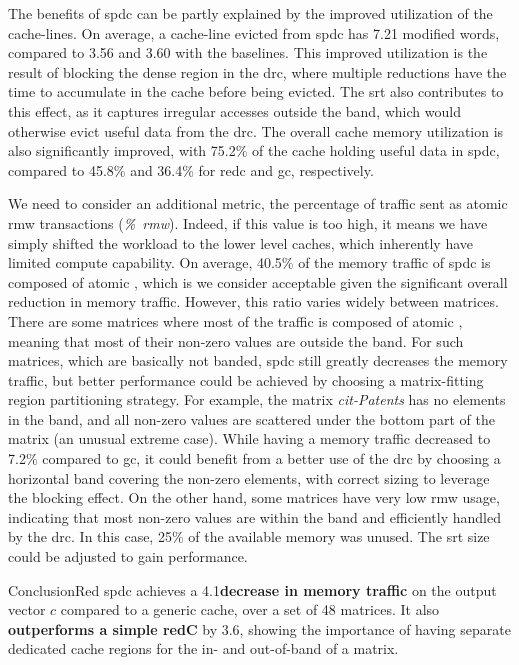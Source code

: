 The benefits of \acrlong{spdc} can be partly explained by the improved utilization of the cache-lines.
On average, a cache-line evicted from \acrlong{spdc} has 7.21 modified words, compared to 3.56 and 3.60 with the baselines.
This improved utilization is the result of blocking the dense region in the \acrshort{drc}, where multiple \glspl{reduction} have the time to accumulate in the cache before being evicted.
The \acrshort{srt} also contributes to this effect, as it captures irregular accesses outside the \gls{band}, which would otherwise evict useful data from the \acrshort{drc}.
The overall cache memory utilization is also significantly improved, with 75.2\% of the cache holding useful data in \acrlong{spdc}, compared to 45.8\% and 36.4\% for \acrshort{redc} and \acrshort{gc}, respectively.

We need to consider an additional metric, the percentage of traffic sent as atomic \acrshort{rmw} transactions (\textit{\%~\acrshort{rmw}}).
Indeed, if this value is too high, it means we have simply shifted the workload to the lower level caches, which inherently have limited compute capability.
On average, 40.5\% of the memory traffic of \acrlong{spdc} is composed of atomic , which is we consider acceptable given the significant overall reduction in memory traffic.
However, this ratio varies widely between matrices.
There are some matrices where most of the traffic is composed of atomic , meaning that most of their non-zero values are outside the \gls{band}.
For such matrices, which are basically not banded, \acrlong{spdc} still greatly decreases the memory traffic, but better performance could be achieved by choosing a matrix-fitting region partitioning strategy.
For example, the matrix \emph{cit-Patents} has no elements in the \gls{band}, and all non-zero values are scattered under the bottom part of the matrix (an unusual extreme case).
While having a memory traffic decreased to 7.2\% compared to \acrshort{gc}, it could benefit from a better use of the \acrshort{drc} by choosing a horizontal band covering the non-zero elements, with correct sizing to leverage the blocking effect.
On the other hand, some matrices have very low \acrshort{rmw} usage, indicating that most non-zero values are within the \gls{band} and efficiently handled by the \acrshort{drc}.
In this case, 25\% of the available memory was unused.
The \acrshort{srt} size could be adjusted to gain performance.

\begin{highlight}{Conclusion}{Red}
    \acrlong{spdc} achieves a 4.1\tms \textbf{decrease in memory traffic} on the output vector $c$ compared to a generic cache, over a set of 48 matrices.
    It also \textbf{outperforms a simple \gls{redC}} by 3.6\tms, showing the importance of having separate dedicated cache regions for the in- and out-of-band of a matrix.
\end{highlight}

